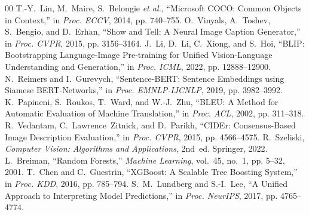 \documentclass[conference]{IEEEtran}
\begin{document}
\balance
\begin{thebibliography}{00}
 T.-Y.~Lin, M.~Maire, S.~Belongie \emph{et al.}, ``Microsoft COCO: Common Objects in Context,'' in \emph{Proc. ECCV}, 2014, pp. 740--755.
 O.~Vinyals, A.~Toshev, S.~Bengio, and D.~Erhan, ``Show and Tell: A Neural Image Caption Generator,'' in \emph{Proc. CVPR}, 2015, pp. 3156--3164.
 J.~Li, D.~Li, C.~Xiong, and S.~Hoi, ``BLIP: Bootstrapping Language-Image Pre-training for Unified Vision-Language Understanding and Generation,'' in \emph{Proc. ICML}, 2022, pp. 12888--12900.
 N.~Reimers and I.~Gurevych, ``Sentence-BERT: Sentence Embeddings using Siamese BERT-Networks,'' in \emph{Proc. EMNLP-IJCNLP}, 2019, pp. 3982--3992.
 K.~Papineni, S.~Roukos, T.~Ward, and W.-J.~Zhu, ``BLEU: A Method for Automatic Evaluation of Machine Translation,'' in \emph{Proc. ACL}, 2002, pp. 311--318.
 R.~Vedantam, C.~Lawrence~Zitnick, and D.~Parikh, ``CIDEr: Consensus-Based Image Description Evaluation,'' in \emph{Proc. CVPR}, 2015, pp. 4566--4575.
 R.~Szeliski, \emph{Computer Vision: Algorithms and Applications}, 2nd~ed. Springer, 2022.
 L.~Breiman, ``Random Forests,'' \emph{Machine Learning}, vol.~45, no.~1, pp. 5--32, 2001.
 T.~Chen and C.~Guestrin, ``XGBoost: A Scalable Tree Boosting System,'' in \emph{Proc. KDD}, 2016, pp. 785--794.
 S.~M.~Lundberg and S.-I.~Lee, ``A Unified Approach to Interpreting Model Predictions,'' in \emph{Proc. NeurIPS}, 2017, pp. 4765--4774.
\end{thebibliography}
\end{document}
